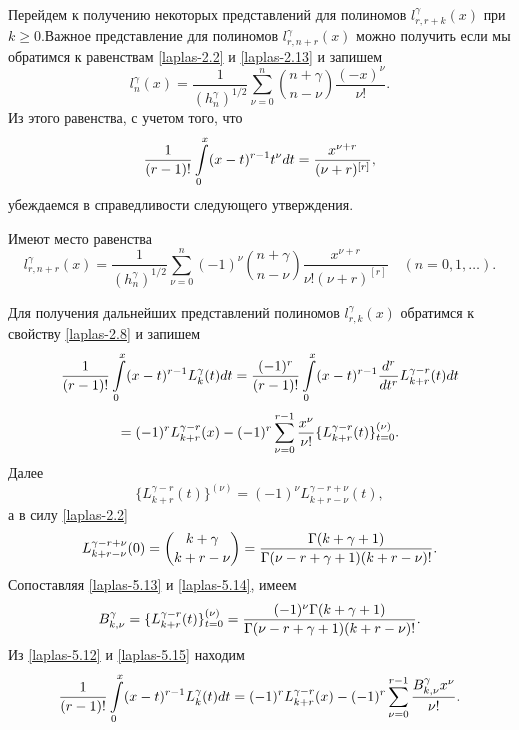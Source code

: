 Перейдем к получению некоторых  представлений для полиномов
$l_{r,r+k}^{\gamma}(x)$ при $k\ge0$.Важное представление для полиномов $l_{r,n+r}^{\gamma}(x)$ можно получить если мы обратимся к равенствам \eqref{laplas-2.2} и \eqref{laplas-2.13} и запишем
\begin{equation*}
l_n^\gamma(x) =\frac{1}{(h_n^\gamma)^{1/2}}
\sum\limits_{\nu=0}^{n}
\binom{n+\gamma}{n-\nu}
\frac{(-x)^\nu}{\nu!}.
\end{equation*}
Из этого равенства, с учетом того, что
\begin{equation*}
{1\over (r-1)!}\int\limits_{0}^x(x-t)^{r-1}t^\nu dt=\frac{x^{\nu+r}}{(\nu+r)^{[r]}},
\end{equation*}
убеждаемся в справедливости следующего утверждения.
\begin{theorem}
Имеют место равенства
\begin{equation*}
l_{r,n+r}^{\gamma}(x)=
\frac{1}{(h_n^\gamma)^{1/2}}
\sum\limits_{\nu=0}^{n}(-1)^\nu \binom{n+\gamma}{n-\nu}
\frac{x^{\nu+r}}{\nu!(\nu+r)^{[r]}}\quad (n=0,1,\ldots).
\end{equation*}
\end{theorem}
Для получения дальнейших представлений полиномов $l_{r,k}^{\gamma}(x)$ обратимся  к свойству \eqref{laplas-2.8} и запишем
 $$
 {1\over
(r-1)!}\int\limits_{0}^x(x-t)^{r-1}
     L^\gamma_k(t)dt=
{(-1)^r\over (r-1)!}\int\limits_{0}^x(x-t)^{r-1}
{d^r\over dt^r}L_{k+r}^{\gamma-r}(t)dt
     $$
 \begin{equation}\label{laplas-5.12}
 =(-1)^rL_{k+r}^{\gamma-r}(x)-(-1)^r\sum_{\nu=0}^{r-1}
{x^\nu\over\nu!}\{L_{k+r}^{\gamma-r}(t)\}_{t=0}^{(\nu)}.
 \end{equation}
Далее
\begin{equation}\label{laplas-5.13}
 \{L_{k+r}^{\gamma-r}(t)\}^{(\nu)}=(-1)^\nu
L_{k+r-\nu}^{\gamma-r+\nu}(t),
  \end{equation}
 а в силу \eqref{laplas-2.2}
 \begin{equation}\label{laplas-5.14}
L_{k+r-\nu}^{\gamma-r+\nu}(0)= {k+\gamma\choose
k+r-\nu}={\Gamma(k+\gamma+1)\over\Gamma(\nu-r+
\gamma+1)(k+r-\nu)!}.
\end{equation}
Сопоставляя \eqref{laplas-5.13} и \eqref{laplas-5.14}, имеем
\begin{equation}\label{laplas-5.15}
B_{k,\nu}^\gamma=\{L_{k+r}^{\gamma-r}(t)\}^{(\nu)}_{t=0}=
{(-1)^\nu\Gamma(k+\gamma+1)\over\Gamma(\nu-r+ \gamma+1)(k+r-\nu)!}.
\end{equation}
Из \eqref{laplas-5.12} и \eqref{laplas-5.15} находим
\begin{equation}\label{laplas-5.16}
{1\over (r-1)!}\int\limits_{0}^x(x-t)^{r-1}
 L^\gamma_k(t)dt=
(-1)^rL_{k+r}^{\gamma-r}(x)-
     (-1)^r\sum_{\nu=0}^{r-1}
{B_{k,\nu}^\gamma x^\nu\over\nu!}.
\end{equation}
